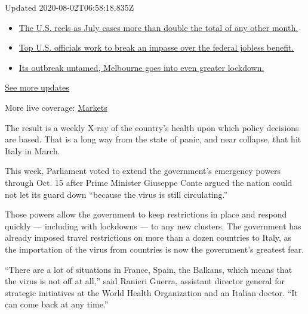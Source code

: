 Updated 2020-08-02T06:58:18.835Z

\begin{itemize}
\tightlist
\item
  \href{https://www.nytimes.com/2020/08/01/world/coronavirus-covid-19.html?action=click\&pgtype=Article\&state=default\&region=MAIN_CONTENT_1\&context=storylines_live_updates\#link-34047410}{The
  U.S. reels as July cases more than double the total of any other
  month.}
\item
  \href{https://www.nytimes.com/2020/08/01/world/coronavirus-covid-19.html?action=click\&pgtype=Article\&state=default\&region=MAIN_CONTENT_1\&context=storylines_live_updates\#link-780ec966}{Top
  U.S. officials work to break an impasse over the federal jobless
  benefit.}
\item
  \href{https://www.nytimes.com/2020/08/01/world/coronavirus-covid-19.html?action=click\&pgtype=Article\&state=default\&region=MAIN_CONTENT_1\&context=storylines_live_updates\#link-2bc8948}{Its
  outbreak untamed, Melbourne goes into even greater lockdown.}
\end{itemize}

\href{https://www.nytimes.com/2020/08/01/world/coronavirus-covid-19.html?action=click\&pgtype=Article\&state=default\&region=MAIN_CONTENT_1\&context=storylines_live_updates}{See
more updates}

More live coverage:
\href{https://www.nytimes.com/live/2020/07/31/business/stock-market-today-coronavirus?action=click\&pgtype=Article\&state=default\&region=MAIN_CONTENT_1\&context=storylines_live_updates}{Markets}

The result is a weekly X-ray of the country's health upon which policy
decisions are based. That is a long way from the state of panic, and
near collapse, that hit Italy in March.

This week, Parliament voted to extend the government's emergency powers
through Oct. 15 after Prime Minister Giuseppe Conte argued the nation
could not let its guard down ``because the virus is still circulating.''

Those powers allow the government to keep restrictions in place and
respond quickly --- including with lockdowns --- to any new clusters.
The government has already imposed travel restrictions on more than a
dozen countries to Italy, as the importation of the virus from countries
is now the government's greatest fear.

``There are a lot of situations in France, Spain, the Balkans, which
means that the virus is not off at all,'' said Ranieri Guerra, assistant
director general for strategic initiatives at the World Health
Organization and an Italian doctor. ``It can come back at any time.''

